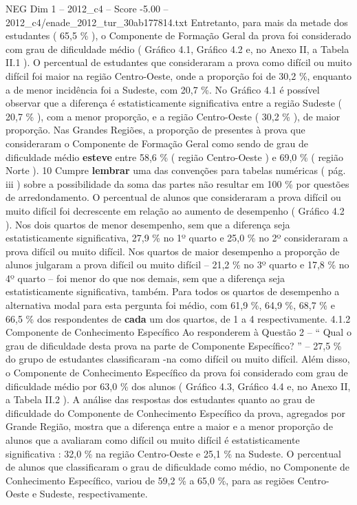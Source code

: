 \begin{textsample}{NEG Dim 1 – 2012\_c4 – Score -5.00 – 2012\_c4/enade\_2012\_tur\_30ab177814.txt}
Entretanto, para mais da metade dos estudantes ( 65,5 \% ), o Componente de Formação Geral da prova foi considerado com grau de dificuldade médio ( Gráfico 4.1, Gráfico 4.2 e, no Anexo II, a Tabela II.1 ).
O percentual de estudantes que consideraram a prova como difícil ou muito difícil foi maior na região Centro-Oeste, onde a proporção foi de 30,2 \%, enquanto a de menor incidência foi a Sudeste, com 20,7 \%.
No Gráfico 4.1 é possível observar que a diferença é estatisticamente significativa entre a região Sudeste ( 20,7 \% ), com a menor proporção, e a região Centro-Oeste ( 30,2 \% ), de maior proporção.
Nas Grandes Regiões, a proporção de presentes à prova que consideraram o Componente de Formação Geral como sendo de grau de dificuldade médio \textbf{esteve} entre 58,6 \% ( região Centro-Oeste ) e 69,0 \% ( região Norte ). 10 Cumpre \textbf{lembrar} uma das convenções para tabelas numéricas ( pág. iii ) sobre a possibilidade da soma das partes não resultar em 100 \% por questões de arredondamento.
O percentual de alunos que consideraram a prova difícil ou muito difícil foi decrescente em relação ao aumento de desempenho ( Gráfico 4.2 ).
Nos dois quartos de menor desempenho, sem que a diferença seja estatisticamente significativa, 27,9 \% no 1º quarto e 25,0 \% no 2º consideraram a prova difícil ou muito difícil.
Nos quartos de maior desempenho a proporção de alunos julgaram a prova difícil ou muito difícil – 21,2 \% no 3º quarto e 17,8 \% no 4º quarto – foi menor do que nos demais, sem que a diferença seja estatisticamente significativa, também.
Para todos os quartos de desempenho a alternativa modal para esta pergunta foi médio, com 61,9 \%, 64,9 \%, 68,7 \% e 66,5 \% dos respondentes de \textbf{cada} um dos quartos, de 1 a 4 respectivamente. 4.1.2 Componente de Conhecimento Específico Ao responderem à Questão 2 – “ Qual o grau de dificuldade desta prova na parte de Componente Específico? ” – 27,5 \% do grupo de estudantes classificaram -na como difícil ou muito difícil.
Além disso, o Componente de Conhecimento Específico da prova foi considerado com grau de dificuldade médio por 63,0 \% dos alunos ( Gráfico 4.3, Gráfico 4.4 e, no Anexo II, a Tabela II.2 ).
A análise das respostas dos estudantes quanto ao grau de dificuldade do Componente de Conhecimento Específico da prova, agregados por Grande Região, mostra que a diferença entre a maior e a menor proporção de alunos que a avaliaram como difícil ou muito difícil é estatisticamente significativa : 32,0 \% na região Centro-Oeste e 25,1 \% na Sudeste.
O percentual de alunos que classificaram o grau de dificuldade como médio, no Componente de Conhecimento Específico, variou de 59,2 \% a 65,0 \%, para as regiões Centro-Oeste e Sudeste, respectivamente.

\end{textsample}

